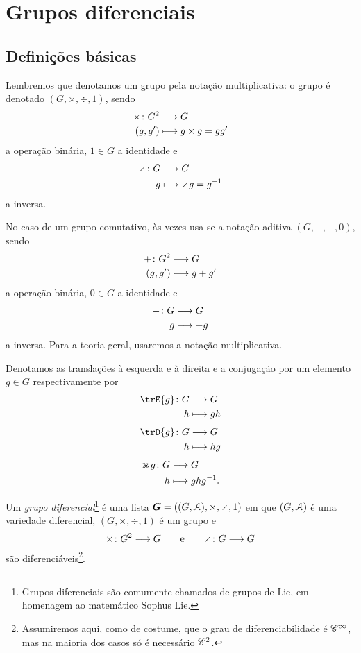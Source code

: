 \chapter{Grupos diferenciais}

\section{Definições básicas}

Lembremos que denotamos um grupo pela notação multiplicativa: o grupo é denotado $(G,\times,\div,1)$, sendo
	\begin{align*}
	{\times}\colon {G^2} &\longrightarrow {G} \\{(g,g')} &\longmapsto g \times g = gg'
	\end{align*}
a operação binária, $1 \in G$ a identidade e
	\begin{align*}
	\func{\div}{G}{G}{g}{\div g = g\inv}
	\end{align*}
a inversa.

No caso de um grupo comutativo, às vezes usa-se a notação aditiva $(G,+,-,0)$, sendo
	\begin{align*}
	{+}\colon {G^2} &\longrightarrow {G} \\{(g,g')} &\longmapsto g+g'
	\end{align*}
a operação binária, $0 \in G$ a identidade e
	\begin{align*}
	{-}\colon {G} &\longrightarrow {G} \\{g} &\longmapsto -g
	\end{align*}
a inversa. Para a teoria geral, usaremos a notação multiplicativa.

Denotamos as translações à esquerda e à direita e a conjugação por um elemento $g \in G$ respectivamente por
	\begin{align*}
	\func{\trE{g}}{G}{G}{h}{gh}
	\end{align*}
	\begin{align*}
	\func{\trD{g}}{G}{G}{h}{hg}
	\end{align*}
	\begin{align*}
	\func{\con{g}}{G}{G}{h}{ghg\inv}.
	\end{align*}

\begin{definition}
Um \emph{grupo diferencial}\footnote{Grupos diferenciais são comumente chamados de grupos de Lie, em homenagem ao matemático Sophus Lie.} é uma lista $\bm G = ((G,\atlas),\times,\div,1)$ em que $(G,\mathcal{A})$ é uma variedade diferencial, $(G,\times,\div,1)$ é um grupo e
	\begin{equation*}
	\fun{\times}{G^2}{G} \qquad\text{e}\qquad \fun{\div}{G}{G}
	\end{equation*}
são diferenciáveis\footnote{Assumiremos aqui, como de costume, que o grau de diferenciabilidade é $\mathscr{C}^\infty$, mas na maioria dos casos só é necessário $\mathscr{C}^2$.}.
\end{definition}

